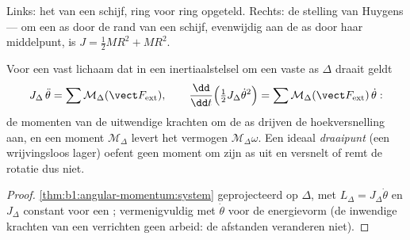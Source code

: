 \begin{omfigure}

{\small Links: het  van een schijf, ring voor ring opgeteld. Rechts:
de stelling van Huygens --- om een as door de rand van een schijf, evenwijdig
aan de as door haar middelpunt, is $J = \tfrac12 MR^2 + MR^2$.}
\end{omfigure}

\begin{theorem}\label{thm:b1:systems-of-points:rotation}
Voor een vast lichaam dat in een inertiaalstelsel om een vaste as $\Delta$ draait geldt
\[
J_\Delta\,\ddot\theta = \sum\mathcal M_\Delta(\vect F_{\mathrm{ext}}),
\qquad
\frac{\dd}{\dd t}\Big(\tfrac12 J_\Delta\dot\theta^2\Big) = \sum\mathcal M_\Delta(\vect F_{\mathrm{ext}})\,\dot\theta :
\]
de momenten van de uitwendige krachten om de as drijven de hoekversnelling
aan, en een moment $\mathcal M_\Delta$ levert het vermogen
$\mathcal M_\Delta\omega$. Een ideaal \emph{draaipunt} (een wrijvingsloos lager) oefent
geen moment om zijn as uit en versnelt of remt de rotatie dus niet.
\end{theorem}

\begin{proof}
\cref{thm:b1:angular-momentum:system} geprojecteerd op $\Delta$, met $L_\Delta
= J_\Delta\dot\theta$ en $J_\Delta$ constant voor een ; vermenigvuldig met
$\dot\theta$ voor de energievorm (de inwendige krachten van een 
verrichten geen arbeid: de afstanden veranderen niet).
\end{proof}


